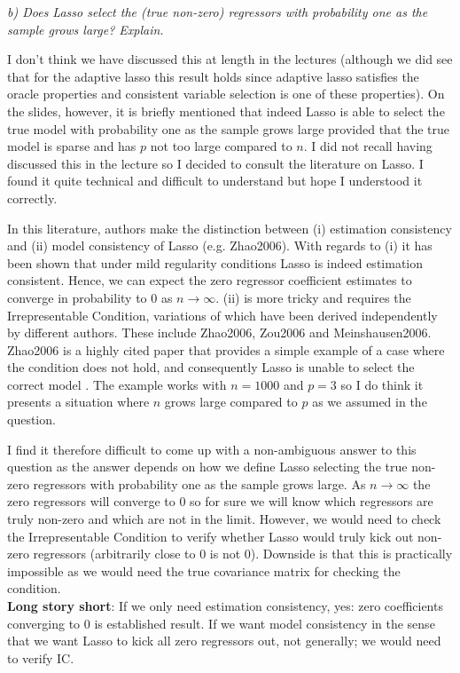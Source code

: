 \documentclass[a4paper,titlepage,onecolumn,table]{article}
\begin{document}
	\textit{b) Does Lasso select the (true non-zero) regressors with probability one as the sample grows large? Explain.} \\[0.2cm]
	\par
	I don't think we have discussed this at length in the lectures (although we did see that for the adaptive lasso this result holds since adaptive lasso satisfies the oracle properties and consistent variable selection is one of these properties). On the slides, however, it is briefly mentioned that indeed Lasso is able to select the true model with probability one as the sample grows large provided that the true model is sparse and has $p$ not too large compared to $n$. I did not recall having discussed this in the lecture so I decided to consult the literature on Lasso. I found it quite technical and difficult to understand but hope I understood it correctly.
	\par
	In this literature, authors make the distinction between (i) estimation consistency and (ii) model consistency of Lasso (e.g. Zhao2006). With regards to (i) it has been shown that under mild regularity conditions Lasso is indeed estimation consistent. Hence, we can expect the zero regressor coefficient estimates to converge in probability to 0 as $n \rightarrow \infty$. (ii) is more tricky and requires the Irrepresentable Condition, variations of which have been derived independently by different authors. These include Zhao2006, Zou2006 and Meinshausen2006. Zhao2006 is a highly cited paper that provides a simple example of a case where the condition does not hold, and consequently Lasso is unable to select the correct model \cite{Zhao:2006:MSC:1248547.1248637}. The example works with $n=1000$ and $p=3$ so I do think it presents a situation where $n$ grows large compared to $p$ as we assumed in the question.
	\par
	I find it therefore difficult to come up with a non-ambiguous answer to this question as the answer depends on how we define Lasso selecting the true non-zero regressors with probability one as the sample grows large. As $n \rightarrow \infty$ the zero regressors will converge to 0 so for sure we will know which regressors are truly non-zero and which are not in the limit. However, we would need to check the Irrepresentable Condition to verify whether Lasso would truly kick out non-zero regressors (arbitrarily close to 0 is not 0). Downside is that this is practically impossible as we would need the true covariance matrix for checking the condition. \\[0.2cm]	
	\textbf{Long story short}: If we only need estimation consistency, yes: zero coefficients converging to 0 is established result. If we want model consistency in the sense that we want Lasso to kick all zero regressors out, not generally; we would need to verify IC.
	
\end{document}
